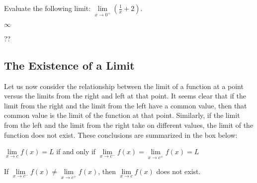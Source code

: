 \begin{comment}
\vspace{-0.5cm}
\begin{figure}[h]%
    \centering
    \subfloat[]{{\texttt{[image: limits/oneSidedLimitTable]} }}%
    \qquad
    \subfloat[]{{\texttt{[image: limits/oneSidedLimitGraph]} }}%
    \caption{}%
    \label{fig:oneSidedLimit}%
\end{figure}
\vspace{-0.5cm}
\end{comment}
\begin{example}
Evaluate the following limit: \(\lim\limits_{x \to 0^+} \left(\displaystyle \frac{1}{x} +2\right)\).
    \begin{sol}
    $\infty$
    \end{sol}
    \begin{solL}
    ??
    \end{solL}
\end{example}
\vspace{1.2 in}

\newpage
\subsection*{The Existence of a Limit}
Let us now consider the relationship between the limit of a function at a point versus the limits from the right and left at that point. It seems clear that if the limit from the right and the limit from the left have a common value, then that common value is the limit of the function at that point. Similarly, if the limit from the left and the limit from the right take on different values, the limit of the function does not exist. These conclusions are summarized in the box below:\\
\begin{tcolorbox}[title = {One-Sided Limit Theorem:}]
\begin{center}
$\lim\limits_{x \to c}f(x)=L$ if and only if $\lim\limits_{x \to c^-}f(x)=\lim\limits_{x \to c^+}f(x)=L$
\end{center}
\end{tcolorbox}

\begin{tcolorbox}[title = {Corollary:}]
\begin{center}
If $\lim\limits_{x \to c^-}f(x)\ne \lim\limits_{x \to c^+}f(x)$, then $\lim\limits_{x \to c}f(x)$ does not exist.
\end{center}
\end{tcolorbox}


